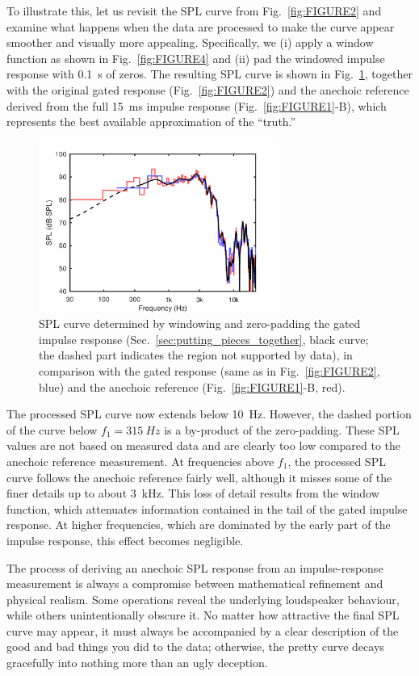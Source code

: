 \documentclass[12pt,a4paper]{article}
\providecommand{\secn}[1]{Sec.~\ref{sec:#1}}
\providecommand{\figlabel}[1]{\label{fig:#1}}
\providecommand{\figr}[1]{Fig.~\ref{fig:#1}}
\begin{document}
To illustrate this, let us revisit the SPL curve from \figr{FIGURE2} and examine what happens when the data are processed to make the curve appear smoother and visually more appealing. Specifically, we (i) apply a window function as shown in \figr{FIGURE4} and (ii) pad the windowed impulse response with \SI{0.1}{s} of zeros. The resulting SPL curve is shown in \figr{FIGURE5}, together with the original gated response (\figr{FIGURE2}) and the anechoic reference derived from the full \SI{15}{ms} impulse response (\mbox{\figr{FIGURE1}-B}), which represents the best available approximation of the “truth.”

\begin{figure}[tbp]
  \begin{center}
    \includegraphics[width=0.7\textwidth]{FIGURE5}
    \caption{SPL curve determined by windowing and zero-padding the gated impulse response (\secn{putting_pieces_together}, black curve; the dashed part indicates the region not supported by data), in comparison with the gated response (same as in \figr{FIGURE2}, blue) and the anechoic reference (\mbox{\figr{FIGURE1}-B}, red).}
    \figlabel{FIGURE5}
  \end{center}
\end{figure}

The processed SPL curve now extends below \SI{10}{Hz}. However, the dashed portion of the curve below $f_1 = \SI{315}{Hz}$ is a by-product of the zero-padding. These SPL values are not based on measured data and are clearly too low compared to the anechoic reference measurement. At frequencies above $f_1$, the processed SPL curve follows the anechoic reference fairly well, although it misses some of the finer details up to about \SI{3}{kHz}. This loss of detail results from the window function, which attenuates information contained in the tail of the gated impulse response. At higher frequencies, which are dominated by the early part of the impulse response, this effect becomes negligible.

The process of deriving an anechoic SPL response from an impulse-response measurement is always a compromise between mathematical refinement and physical realism. Some operations reveal the underlying loudspeaker behaviour, while others unintentionally obscure it. No matter how attractive the final SPL curve may appear, it must always be accompanied by a clear description of the good and bad things you did to the data; otherwise, the pretty curve decays gracefully into nothing more than an ugly deception.
\end{document}
